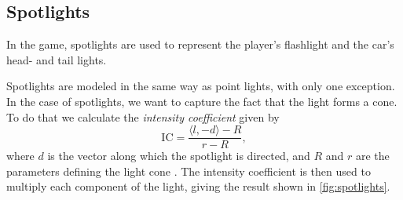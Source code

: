 \subsection{Spotlights}
In the game, spotlights are used to represent the player's flashlight and the car's head- and tail lights.

Spotlights are modeled in the same way as point lights, with only one exception.
In the case of spotlights, we want to capture the fact that the light forms a cone.
To do that we calculate the \textit{intensity coefficient} given by
\begin{equation*}
    \mathrm{IC} = \frac{\langle l, -d \rangle - R}{r - R},
\end{equation*}
where $d$ is the vector along which the spotlight is directed, and $R$ and $r$ are the parameters defining the light cone \cite{LearnOpenGL-Light-casters}.
The intensity coefficient is then used to multiply each component of the light, giving the result shown in \autoref{fig:spotlights}.
